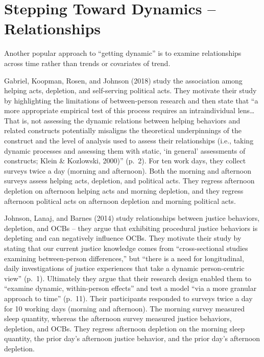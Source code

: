 \documentclass[english,,man]{apa6}
\theoremstyle{definition}
\theoremstyle{definition}
\theoremstyle{definition}
\theoremstyle{remark}
\begin{document}
\hypertarget{stepping-toward-dynamics-relationships}{%
\section{Stepping Toward Dynamics --
Relationships}\label{stepping-toward-dynamics-relationships}}

Another popular approach to \enquote{getting dynamic} is to examine
relationships across time rather than trends or covariates of trend.

Gabriel, Koopman, Rosen, and Johnson (2018) study the association among
helping acts, depletion, and self-serving political acts. They motivate
their study by highlighting the limitations of between-person research
and then state that \enquote{a more appropriate empirical test of this
process requires an intraindividual lens\ldots{} That is, not assessing
the dynamic relations between helping behaviors and related constructs
potentially misaligns the theoretical underpinnings of the construct and
the level of analysis used to assess their relationships (i.e., taking
dynamic processes and assessing them with static, \enquote{in general}
assessments of constructs; Klein \& Kozlowski, 2000)} (p.~2). For ten
work days, they collect surveys twice a day (morning and afternoon).
Both the morning and afternoon surveys assess helping acts, depletion,
and political acts. They regress afternoon depletion on afternoon
helping acts and morning depletion, and they regress afternoon political
acts on afternoon depletion and morning political acts.

Johnson, Lanaj, and Barnes (2014) study relationships between justice
behaviors, depletion, and OCBs -- they argue that exhibiting procedural
justice behaviors is depleting and can negatively influence OCBs. They
motivate their study by stating that our current justice knowledge comes
from \enquote{cross-sectional studies examining between-person
differences,} but \enquote{there is a need for longitudinal, daily
investigations of justice experiences that take a dynamic person-centric
view} (p.~1). Ultimately they argue that their research design enabled
them to \enquote{examine dynamic, within-person effects} and test a
model \enquote{via a more granular approach to time} (p.~11). Their
participants responded to surveys twice a day for 10 working days
(morning and afternoon). The morning survey measured sleep quantity,
whereas the afternoon survey measured justice behaviors, depletion, and
OCBs. They regress afternoon depletion on the morning sleep quantity,
the prior day's afternoon justice behavior, and the prior day's
afternoon depletion.
\end{document}
